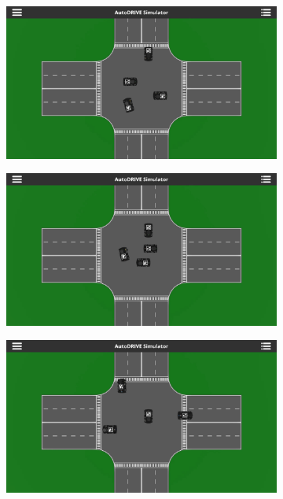 \documentclass[letterpaper, 10 pt, conference]{ieeeconf}  %
\begin{document}
\begin{figure}[t]
     \centering
     \begin{subfigure}[b]{0.16\linewidth}
         \centering
         \includegraphics[width=\linewidth]{Fig6a.png}
         \caption{}
         \label{fig6a}
     \end{subfigure}
     \hfill
     \begin{subfigure}[b]{0.16\linewidth}
         \centering
         \includegraphics[width=\linewidth]{Fig6b.png}
         \caption{}
         \label{fig6b}
     \end{subfigure}
     \hfill
     \begin{subfigure}[b]{0.16\linewidth}
         \centering
         \includegraphics[width=\linewidth]{Fig6c.png}

\end{subfigure}
\end{figure}
\end{document}
